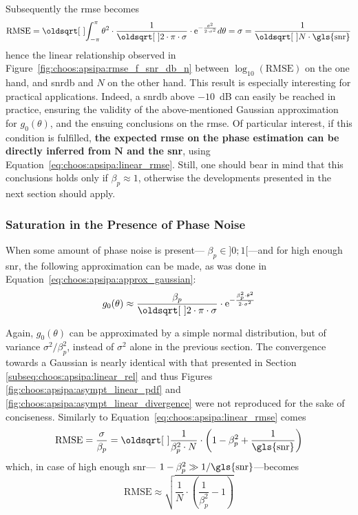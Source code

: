 Subsequently the \gls{rmse} becomes
\begin{equation}\label{eq:choos:apsipa:linear_rmse}
	\text{RMSE} = \sqrt{\int_{-\pi}^{\pi} \theta^2 \cdot 	\frac{1}{\sqrt{2 \cdot \pi} \cdot 	\sigma} \cdot \e^{-\frac{\theta^2}{2\cdot \sigma^2}} d\theta} = \sigma = \frac{1}{\sqrt{N \cdot \text{\gls{snr}}}}
\end{equation}
hence the linear relationship observed in Figure~\ref{fig:choos:apsipa:rmse_f_snr_db_n} between $\log_{10}(\text{RMSE})$ on the one hand, and \gls{snrdb} and $N$ on the other hand. This result is especially interesting for practical applications. Indeed, a \gls{snrdb} above $-10$~dB can easily be reached in practice, ensuring the validity of the above-mentioned Gaussian approximation for $g_0(\theta)$, and the ensuing conclusions on the \gls{rmse}. Of particular interest, if this condition is fulfilled, \textbf{the expected \gls{rmse} on the phase estimation can be directly inferred from $\mathbf{N}$ and the \gls{snr}}, using Equation~\ref{eq:choos:apsipa:linear_rmse}. Still, one should bear in mind that this conclusions holds only if $\beta_p \approx 1$, otherwise the developments presented in the next section should apply.

\subsubsection{Saturation in the Presence of Phase Noise}\label{subsect:choos:apsipa:phase_noise_satu}

When some amount of phase noise is present---\ie{} $\beta_p \in ]0;1[$---and for high enough \gls{snr}, the following approximation can be made, as was done in Equation~\ref{eq:choos:apsipa:approx_gaussian}:
\begin{equation}
	g_0(\theta) \approx \frac{\beta_p}{\sqrt{2 \cdot \pi} \cdot 	\sigma} \cdot \e^{-\frac{\beta_p^2 \cdot \theta^2}{2\cdot \sigma^2}}
\end{equation}

Again, $g_0(\theta)$ can be approximated by a simple normal distribution, but of variance $\sigma^2 / \beta_p^2$, instead of $\sigma^2$ alone in the previous section. The convergence towards a Gaussian is nearly identical with that presented in Section \ref{subseq:choos:apsipa:linear_rel} and thus Figures \ref{fig:choos:apsipa:asympt_linear_pdf} and \ref{fig:choos:apsipa:asympt_linear_divergence} were not reproduced for the sake of conciseness. Similarly to Equation~\ref{eq:choos:apsipa:linear_rmse} comes
\begin{equation}\label{eq:choos:apsipa:rmse_phase_noise_gene}
	\text{RMSE} = \frac{\sigma}{\beta_p} = \sqrt{\frac{1}{\beta_p^2 \cdot N} \cdot \left(1 - \beta_p^2 + \frac{1}{\text{\gls{snr}}}\right)}
\end{equation}
which, in case of high enough \gls{snr}---\ie{} $1-\beta_p^2 \gg 1/\text{\gls{snr}}$---becomes
\begin{equation}\label{eq:choos:apsipa:rmse_phase_noise_floor}
	\text{RMSE} \approx \sqrt{\frac{1}{N}\cdot \left(\frac{1}{\beta_p^2} - 1 \right)}
\end{equation}


